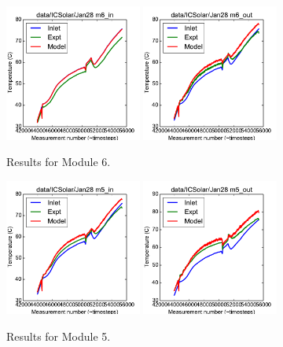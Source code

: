 \documentclass{article}
\begin{document}
\begin{figure}[!ht]
\centering
\includegraphics[width=0.4\textwidth]{../../data/ICSolar/images/Jan28_m6_in_unsteady.pdf}\hspace{0.05\textwidth}
\includegraphics[width=0.4\textwidth]{../../data/ICSolar/images/Jan28_m6_out_unsteady.pdf}\hspace{0.05\textwidth}\\
\caption{Results for Module 6.}\end{figure}
\begin{figure}[!ht]
\centering
\includegraphics[width=0.4\textwidth]{../../data/ICSolar/images/Jan28_m5_in_unsteady.pdf}\hspace{0.05\textwidth}
\includegraphics[width=0.4\textwidth]{../../data/ICSolar/images/Jan28_m5_out_unsteady.pdf}\hspace{0.05\textwidth}\\
\caption{Results for Module 5.}\end{figure}
\end{document}

